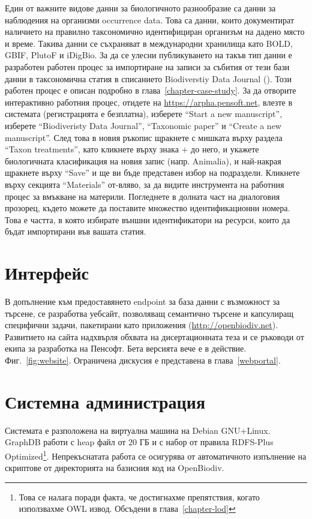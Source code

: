 Един от важните видове данни за биологичното разнообразие са данни за наблюдения на организми occurrence data. Това са данни, които документират наличието на правилно таксономично идентифициран организъм на дадено място и време. Такива данни се съхраняват в международни хранилища като BOLD, GBIF, PlutoF и iDigBio. За да се улесни публикуването на такъв тип данни е разработен работен процес за импортиране на записи за събития от тези бази данни в таксономична статия в списанието Biodiverstiy Data Journal (\cite{senderov_online_2016}). Този работен процес е описан подробно в глава~\ref{chapter-case-study}. За да отворите интерактивно работния процес, отидете на \url{https://arpha.pensoft.net}, влезте в системата (регистрацията е безплатна), изберете ``Start a new manuscript'', изберете ``Biodiveristy Data Journal'', ``Taxonomic paper''  и ``Create a new manuscript''. След това в новия ръкопис щракнете с мишката върху раздела ``Taxon treatments'', като кликнете върху знака $+$ до него, и укажете биологичната класификация на новия запис (напр. Animalia), и най-накрая щракнете върху ``Save'' и ще ви бъде представен избор на подраздели. Кликнете върху секцията ``Materials'' от-вляво, за да видите инструмента на работния процес за вмъкване на материли. Погледнете в долната част на диалоговия прозорец, където можете да поставите множество идентификационни номера. Това е частта, в която избирате външни идентификатори на ресурси, които да бъдат импортирани във вашата статия.

\section{Интерфейс}

В допълнение към предоставянето endpoint за база данни с възможност за търсене, се разработва уебсайт, позволяващ семантично търсене и капсулиращ специфични задачи, пакетирани като приложения (\url{http://openbiodiv.net}). Развитието на сайта надхвърля обхвата на дисертационната теза и се ръководи от екипа за разработка на Пенсофт. Бета версията вече е в действие. Фиг.~\ref{fig:website}. Ограничена дискусия е представена в глава~\ref{webportal}.

\section{Системна администрация}

Системата е разположена на виртуална машина на Debian GNU+Linux. GraphDB работи с heap файл от 20 ГБ и с набор от правила RDFS-Plus Optimized\footnote{Това се налага поради факта, че достигнахме препятствия, когато използвахме OWL извод. Обсъдени в глава~\ref {chapter-lod}}. Непрекъснатата работа се осигурява от автоматичното изпълнение на скриптове от директорията  на базисния код на OpenBiodiv.

